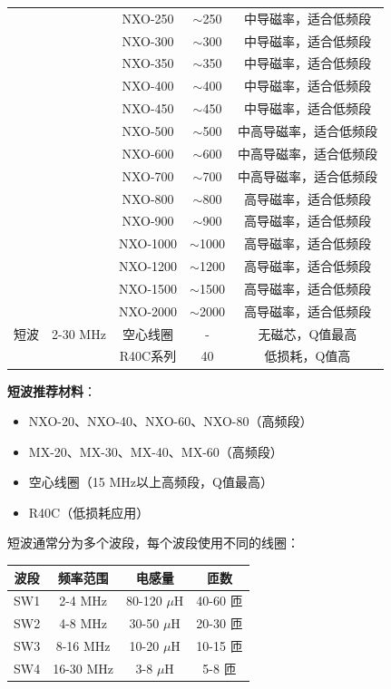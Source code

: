 \begin{center}
\begin{tabular}{|c|c|c|c|c|}
 & & NXO-250 & $\sim$250 & 中导磁率，适合低频段 \\
 & & NXO-300 & $\sim$300 & 中导磁率，适合低频段 \\
 & & NXO-350 & $\sim$350 & 中导磁率，适合低频段 \\
 & & NXO-400 & $\sim$400 & 中导磁率，适合低频段 \\
 & & NXO-450 & $\sim$450 & 中导磁率，适合低频段 \\
 & & NXO-500 & $\sim$500 & 中高导磁率，适合低频段 \\
 & & NXO-600 & $\sim$600 & 中高导磁率，适合低频段 \\
 & & NXO-700 & $\sim$700 & 中高导磁率，适合低频段 \\
 & & NXO-800 & $\sim$800 & 高导磁率，适合低频段 \\
 & & NXO-900 & $\sim$900 & 高导磁率，适合低频段 \\
 & & NXO-1000 & $\sim$1000 & 高导磁率，适合低频段 \\
 & & NXO-1200 & $\sim$1200 & 高导磁率，适合低频段 \\
 & & NXO-1500 & $\sim$1500 & 高导磁率，适合低频段 \\
 & & NXO-2000 & $\sim$2000 & 高导磁率，适合低频段 \\
\hline
短波 & 2-30 MHz & 空心线圈 & - & 无磁芯，Q值最高 \\
 & & R40C系列 & 40 & 低损耗，Q值高 \\
\hline
\end{tabular}
\end{center}

\textbf{短波推荐材料}：
\begin{itemize}
    \item NXO-20、NXO-40、NXO-60、NXO-80（高频段）
    \item MX-20、MX-30、MX-40、MX-60（高频段）
    \item 空心线圈（15 MHz以上高频段，Q值最高）
    \item R40C（低损耗应用）
\end{itemize}

短波通常分为多个波段，每个波段使用不同的线圈：

\begin{center}
\begin{tabular}{|c|c|c|c|}
\hline
\textbf{波段} & \textbf{频率范围} & \textbf{电感量} & \textbf{匝数} \\
\hline
SW1 & 2-4 MHz & 80-120 $\mu$H & 40-60 匝 \\
SW2 & 4-8 MHz & 30-50 $\mu$H & 20-30 匝 \\
SW3 & 8-16 MHz & 10-20 $\mu$H & 10-15 匝 \\
SW4 & 16-30 MHz & 3-8 $\mu$H & 5-8 匝 \\
\hline
\end{tabular}
\end{center}

